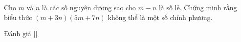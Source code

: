 \ifshowproblem
\begin{problem}\label{problem:THA-2015-MO-P8}
    Cho \( m \) và \( n \) là các số nguyên dương sao cho \( m - n \) là số lẻ.  
    Chứng minh rằng biểu thức \( (m + 3n)(5m + 7n) \) không thể là một số chính phương.
\end{problem}
\fi

\ifshowinfo
Đánh giá [\textbf{}]\footnotemark
{}
\fi